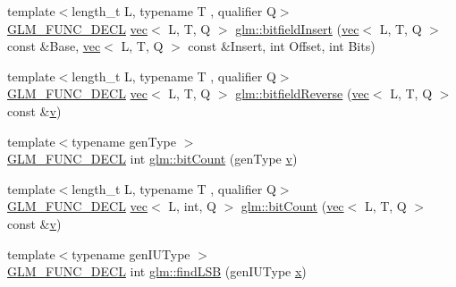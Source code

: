 \begin{DoxyCompactItemize}
{\footnotesize template$<$length\+\_\+t L, typename T , qualifier Q$>$ }\\\mbox{\hyperlink{setup_8hpp_ab2d052de21a70539923e9bcbf6e83a51}{G\+L\+M\+\_\+\+F\+U\+N\+C\+\_\+\+D\+E\+CL}} \mbox{\hyperlink{structglm_1_1vec}{vec}}$<$ L, T, Q $>$ \mbox{\hyperlink{group__core__func__integer_ga2e82992340d421fadb61a473df699b20}{glm\+::bitfield\+Insert}} (\mbox{\hyperlink{structglm_1_1vec}{vec}}$<$ L, T, Q $>$ const \&Base, \mbox{\hyperlink{structglm_1_1vec}{vec}}$<$ L, T, Q $>$ const \&Insert, int Offset, int Bits)
\item 
{\footnotesize template$<$length\+\_\+t L, typename T , qualifier Q$>$ }\\\mbox{\hyperlink{setup_8hpp_ab2d052de21a70539923e9bcbf6e83a51}{G\+L\+M\+\_\+\+F\+U\+N\+C\+\_\+\+D\+E\+CL}} \mbox{\hyperlink{structglm_1_1vec}{vec}}$<$ L, T, Q $>$ \mbox{\hyperlink{group__core__func__integer_ga750a1d92464489b7711dee67aa3441b6}{glm\+::bitfield\+Reverse}} (\mbox{\hyperlink{structglm_1_1vec}{vec}}$<$ L, T, Q $>$ const \&\mbox{\hyperlink{_s_d_l__opengl_8h_a10a82eabcb59d2fcd74acee063775f90}{v}})
\item 
{\footnotesize template$<$typename gen\+Type $>$ }\\\mbox{\hyperlink{setup_8hpp_ab2d052de21a70539923e9bcbf6e83a51}{G\+L\+M\+\_\+\+F\+U\+N\+C\+\_\+\+D\+E\+CL}} int \mbox{\hyperlink{group__core__func__integer_ga44abfe3379e11cbd29425a843420d0d6}{glm\+::bit\+Count}} (gen\+Type \mbox{\hyperlink{_s_d_l__opengl_8h_a10a82eabcb59d2fcd74acee063775f90}{v}})
\item 
{\footnotesize template$<$length\+\_\+t L, typename T , qualifier Q$>$ }\\\mbox{\hyperlink{setup_8hpp_ab2d052de21a70539923e9bcbf6e83a51}{G\+L\+M\+\_\+\+F\+U\+N\+C\+\_\+\+D\+E\+CL}} \mbox{\hyperlink{structglm_1_1vec}{vec}}$<$ L, int, Q $>$ \mbox{\hyperlink{group__core__func__integer_gaac7b15e40bdea8d9aa4c4cb34049f7b5}{glm\+::bit\+Count}} (\mbox{\hyperlink{structglm_1_1vec}{vec}}$<$ L, T, Q $>$ const \&\mbox{\hyperlink{_s_d_l__opengl_8h_a10a82eabcb59d2fcd74acee063775f90}{v}})
\item 
{\footnotesize template$<$typename gen\+I\+U\+Type $>$ }\\\mbox{\hyperlink{setup_8hpp_ab2d052de21a70539923e9bcbf6e83a51}{G\+L\+M\+\_\+\+F\+U\+N\+C\+\_\+\+D\+E\+CL}} int \mbox{\hyperlink{group__core__func__integer_gaf74c4d969fa34ab8acb9d390f5ca5274}{glm\+::find\+L\+SB}} (gen\+I\+U\+Type \mbox{\hyperlink{_s_d_l__opengl_8h_ad0e63d0edcdbd3d79554076bf309fd47}{x}})
\item 

\end{DoxyCompactItemize}

